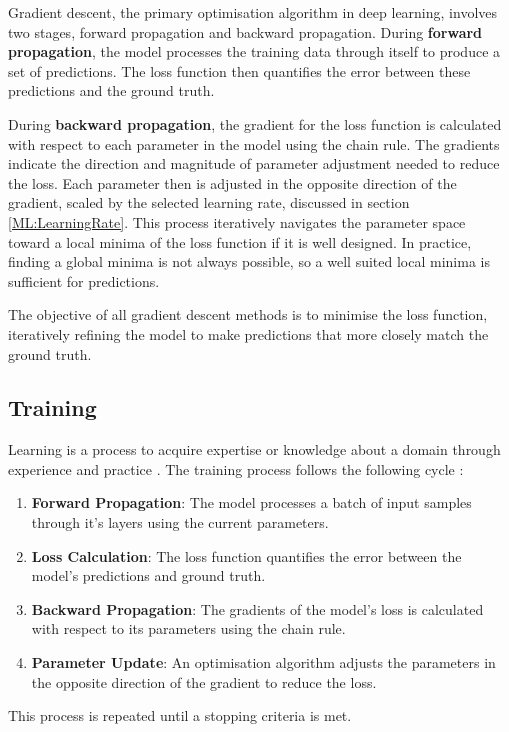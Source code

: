 Gradient descent, the primary optimisation algorithm in deep learning, involves two stages, forward propagation and backward propagation. During \textbf{forward  propagation}, the model processes the training data through itself to produce a set of predictions. The loss function then quantifies the error between these predictions and the ground truth.

During \textbf{backward propagation}, the gradient for the loss function is calculated with respect to each parameter in the model using the chain rule. The gradients indicate the direction and magnitude of parameter adjustment needed to reduce the loss. Each parameter then is adjusted in the opposite direction of the gradient, scaled by the selected learning rate, discussed in section \ref{ML:LearningRate}.  This process iteratively navigates the parameter space toward a local minima of the loss function if it is well designed. In practice, finding a global minima is not always possible, so a well suited local minima is sufficient for predictions.

The objective of all gradient descent methods is to minimise the loss function, iteratively refining the model to make predictions that more closely match the ground truth.

\subsection{Training}
Learning is a process to acquire expertise or knowledge about a domain through experience and practice \cite{LearningDefinition1}\cite{LearningDefinition2}. The training process follows the following cycle \cite{DeepLearningGoodfellow}:
\begin{enumerate}
    \item \textbf{Forward Propagation}: The model processes a batch of input samples through it's layers using the current parameters.
    \item \textbf{Loss Calculation}: The loss function quantifies the error between the model's predictions and ground truth.
    \item \textbf{Backward Propagation}: The gradients of the model's loss is calculated with respect to its parameters using the chain rule.
    \item \textbf{Parameter Update}: An optimisation algorithm adjusts the parameters in the opposite direction of the gradient to reduce the loss.
\end{enumerate}
This process is repeated until a stopping criteria is met.

